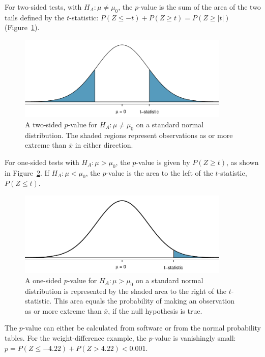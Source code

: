 For two-sided tests, with $H_A: \mu \neq \mu_0$, the $p$-value is the sum of the area of the two tails defined by the $t$-statistic: $P(Z \leq -t) + P(Z \geq t) = P(Z \geq |t| )$ (Figure~\ref{pValueTwoSided}).

\begin{figure}[h]
	\centering
	\includegraphics[width=0.9\textwidth]{ch_inference_foundations_oi_biostat/figures/pValueTwoSided/pValueTwoSided}
	\caption{A two-sided $p$-value for $H_A: \mu \neq \mu_0$ on a standard normal distribution. The shaded regions represent observations as or more extreme than $\overline{x}$ in either direction.}
	\label{pValueTwoSided}
\end{figure}

For one-sided tests with $H_A: \mu > \mu_0$, the $p$-value is given by $P(Z \geq t)$, as shown in Figure~\ref{pValueOneSided}. If $H_A: \mu < \mu_0$, the $p$-value is the area to the left of the $t$-statistic, $P(Z \leq t)$.

\begin{figure}[h]
	\centering
	\includegraphics[width=0.9\textwidth]{ch_inference_foundations_oi_biostat/figures/pValueOneSided/pValueOneSided}
	\caption{A one-sided $p$-value for $H_A: \mu > \mu_0$ on a standard normal distribution is represented by the shaded area to the right of the $t$-statistic. This area equals the probability of making an observation as or more extreme than $\overline{x}$, if the null hypothesis is true.}
	\label{pValueOneSided}
\end{figure}


The $p$-value can either be calculated from software or from the normal probability tables. For the weight-difference example, the $p$-value is vanishingly small: $p = P(Z \leq - 4.22) + P(Z > 4.22)< 0.001$.

